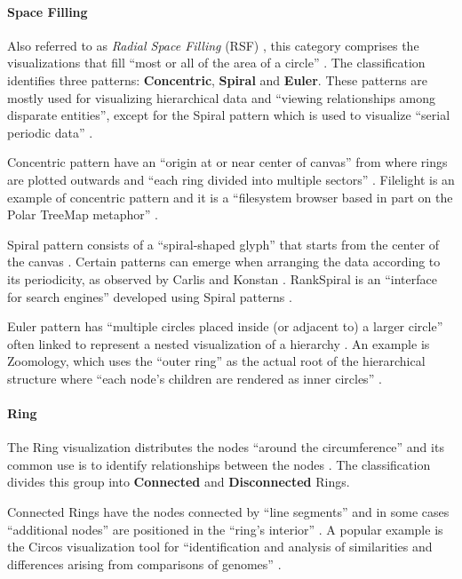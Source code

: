 \documentclass[twocolumn]{bmcart}%
\begin{document}
\paragraph*{Space Filling}
Also referred to as \textit{Radial Space Filling} (RSF) \cite{draper2009survey, yang2002interring}, this category comprises the visualizations that fill ``most or all of the area of a circle'' \cite{draper2009survey}. The classification identifies three patterns: \textbf{Concentric}, \textbf{Spiral} and \textbf{Euler}. These patterns are mostly used for visualizing hierarchical data and ``viewing relationships among disparate entities'', except for the Spiral pattern which is used to visualize ``serial periodic data'' \cite{draper2009survey}.

Concentric pattern have an ``origin at or near center of canvas'' from where rings are plotted outwards and ``each ring divided into multiple sectors''  \cite{draper2009survey}. Filelight is an example of concentric pattern and it is a ``filesystem browser based in part on the Polar TreeMap metaphor'' \cite{HowellFilelight, draper2009survey}.

Spiral pattern consists of a ``spiral-shaped glyph'' that starts from the center of the canvas \cite{draper2009survey}. Certain patterns can emerge when arranging the data according to its periodicity, as observed by Carlis and Konstan \cite{draper2009survey, carlis1998interactive}. RankSpiral is an ``interface for search engines'' developed using Spiral patterns \citep{spoerri2004rankspiral, draper2009survey}.

Euler pattern has ``multiple circles placed inside (or adjacent to) a larger circle'' often linked to represent a nested visualization of a hierarchy \cite{draper2009survey}. An example is Zoomology, which uses the ``outer ring'' as the actual root of the hierarchical structure where ``each node’s children are rendered as inner circles'' \cite{hong2003zoomology, draper2009survey}.

\paragraph*{Ring}

The Ring visualization distributes the nodes ``around the circumference'' and its common use is to identify relationships between the nodes \cite{draper2009survey}. The classification divides this group into \textbf{Connected} and \textbf{Disconnected} Rings.

Connected Rings have the nodes connected by ``line segments'' and in some cases ``additional nodes''  are positioned in the ``ring’s interior'' \cite{draper2009survey}. A popular example is the Circos visualization tool for ``identification and analysis of similarities and differences arising from comparisons of genomes'' \cite{krzywinski2009circos}.
\end{document}
